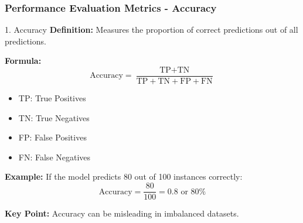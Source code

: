 \documentclass[aspectratio=169]{beamer}
\begin{document}
\begin{frame}[fragile]
    \frametitle{Performance Evaluation Metrics - Accuracy}
    \begin{block}{1. Accuracy}
        \textbf{Definition:} Measures the proportion of correct predictions out of all predictions.
        
        \textbf{Formula:}
        \begin{equation}
            \text{Accuracy} = \frac{\text{TP} + \text{TN}}{\text{TP} + \text{TN} + \text{FP} + \text{FN}}
        \end{equation}

        \begin{itemize}
            \item TP: True Positives
            \item TN: True Negatives
            \item FP: False Positives
            \item FN: False Negatives
        \end{itemize}

        \textbf{Example:} 
        If the model predicts 80 out of 100 instances correctly:
        \[
        \text{Accuracy} = \frac{80}{100} = 0.8 \text{ or } 80\%
        \]

        \textbf{Key Point:} 
        Accuracy can be misleading in imbalanced datasets.
    \end{block}
\end{frame}
\end{document}
